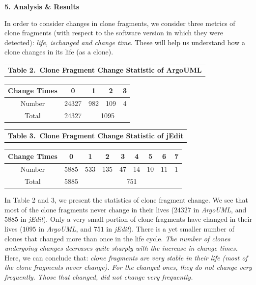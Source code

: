 \begin{center}{\large\bf 5. Analysis \& Results}\end{center}


In order to consider changes in clone fragments, we consider three metrics of clone fragments (with respect to the software version in which they were detected): {\em life, ischanged and change time}. These will help us understand how a clone changes in its life (as a clone). 
{
\tabcolsep=2.5pt 
\scriptsize
\begin{center}
\begin{tabular}{c}
{\bf Table 2.\ Clone Fragment  Change Statistic of ArgoUML}\\ 
\end{tabular}
\begin{tabular}{|c|c|c|c|c|}
\hline
Change Times&0&1&2&3\\ \hline
Number&24327&982&109&4\\ \hline
Total&24327&\multicolumn{3}{c}{ 1095}\vline \\
 \hline
\end{tabular}
\end{center}
}
{
\tabcolsep=2.5pt 
\scriptsize
\begin{center}
\begin{tabular}{c}
{\bf Table 3.\ Clone Fragment Change Statistic of jEdit}\\ 
\end{tabular}
\begin{tabular}{|c|c|c|c|c|c|c|c|c|}
\hline
Change Times &0&1&2&3&4&5&6&7\\ \hline
Number&5885&533&135&47&14&10&11&1\\ \hline
Total&5885&\multicolumn{7}{c}{751}  \vline \\ \hline
\end{tabular}
\end{center}
}
In Table 2 and 3, we present the statistics of clone fragment change. We see that most of the clone fragments never change in their lives ($24327$ in {\em ArgoUML}, and $5885$ in {\em jEdit}). Only a very small portion of clone fragments have changed in their lives ($1095$ in {\em ArgoUML}, and $751$ in {\em jEdit}). There is a yet smaller number of clones that changed more than once in the life cycle. {\em The number of clones undergoing changes decreases quite sharply with the increase in change times.} Here, we can conclude that: {\em clone fragments are very stable in their life (most of the clone fragments never change). For the changed ones, they do not change very frequently. Those that changed, did not change very frequently.}
